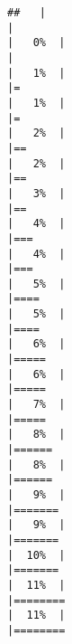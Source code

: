 \documentclass[
]{article}
\begin{document}
\begin{verbatim}
##   |                                                                              |                                                                      |   0%  |                                                                              |                                                                      |   1%  |                                                                              |=                                                                     |   1%  |                                                                              |=                                                                     |   2%  |                                                                              |==                                                                    |   2%  |                                                                              |==                                                                    |   3%  |                                                                              |==                                                                    |   4%  |                                                                              |===                                                                   |   4%  |                                                                              |===                                                                   |   5%  |                                                                              |====                                                                  |   5%  |                                                                              |====                                                                  |   6%  |                                                                              |=====                                                                 |   6%  |                                                                              |=====                                                                 |   7%  |                                                                              |=====                                                                 |   8%  |                                                                              |======                                                                |   8%  |                                                                              |======                                                                |   9%  |                                                                              |=======                                                               |   9%  |                                                                              |=======                                                               |  10%  |                                                                              |=======                                                               |  11%  |                                                                              |========                                                              |  11%  |                                                                              |========  
\end{verbatim}
\end{document}
